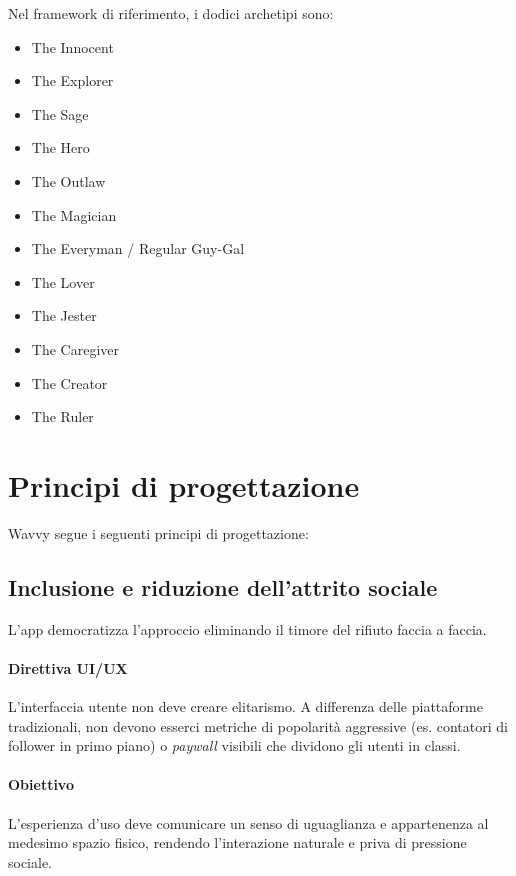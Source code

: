 \documentclass[a4paper, 11pt, table, dvipsnames]{article}
\begin{document}
Nel framework di riferimento, i dodici archetipi sono:
\begin{itemize}
      \item The Innocent

      \item The Explorer

      \item The Sage

      \item The Hero

      \item The Outlaw

      \item The Magician

      \item The Everyman / Regular Guy-Gal

      \item The Lover

      \item The Jester

      \item The Caregiver

      \item The Creator

      \item The Ruler
\end{itemize}

\section{Principi di progettazione}
Wavvy segue i seguenti principi di progettazione:

\subsection{Inclusione e riduzione dell'attrito sociale}
L'app democratizza l'approccio eliminando il timore del
rifiuto faccia a faccia.

\paragraph{Direttiva UI/UX}
L'interfaccia utente non deve creare elitarismo. A
differenza delle piattaforme tradizionali, non devono esserci
metriche di popolarità aggressive (es. contatori di follower
in primo piano) o \textit{paywall} visibili che dividono gli
utenti in classi.

\paragraph{Obiettivo}
L'esperienza d'uso deve comunicare un senso di uguaglianza
e appartenenza al medesimo spazio fisico, rendendo l'interazione
naturale e priva di pressione sociale.
\end{document}
